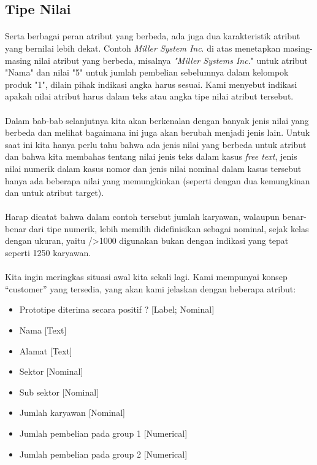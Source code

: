 \subsection{Tipe Nilai}
\paragraph{} Serta berbagai peran atribut yang berbeda, ada juga dua karakteristik atribut yang bernilai lebih dekat. Contoh \textit{Miller System Inc}. di atas menetapkan masing-masing nilai atribut yang berbeda, misalnya \textit{"Miller Systems Inc}." untuk atribut "Nama" dan nilai "5" untuk jumlah pembelian sebelumnya dalam kelompok produk "1", dilain pihak indikasi angka harus sesuai. Kami menyebut indikasi apakah nilai atribut harus dalam teks atau angka tipe nilai atribut tersebut.

\paragraph{} Dalam bab-bab selanjutnya kita akan berkenalan dengan banyak jenis nilai yang berbeda dan melihat bagaimana ini juga akan berubah menjadi jenis lain. Untuk saat ini kita hanya perlu tahu bahwa ada jenis nilai yang berbeda untuk atribut dan bahwa kita membahas tentang nilai jenis teks dalam kasus \textit{free text}, jenis nilai numerik dalam kasus nomor dan jenis nilai nominal dalam kasus tersebut hanya ada beberapa nilai yang memungkinkan (seperti dengan dua kemungkinan \ya dan \tidak untuk atribut target).

\paragraph{} Harap dicatat bahwa dalam contoh tersebut jumlah karyawan, walaupun benar-benar dari tipe numerik, lebih memilih didefinisikan sebagai nominal, sejak kelas dengan ukuran, yaitu />1000 digunakan bukan dengan indikasi yang tepat seperti 1250 karyawan.

\paragraph{} Kita ingin meringkas situasi awal kita sekali lagi. Kami mempunyai konsep “customer” yang tersedia, yang akan kami jelaskan dengan beberapa atribut:

\begin{itemize}
    \item 	Prototipe diterima secara positif ? [Label; Nominal]
\item 	Nama [Text]
\item 	Alamat [Text]
\item 	Sektor [Nominal]
\item 	Sub sektor [Nominal]
\item 	Jumlah karyawan [Nominal]
\item 	Jumlah pembelian pada group 1 [Numerical]
\item 	Jumlah pembelian pada group 2 [Numerical] 

\end{itemize}

